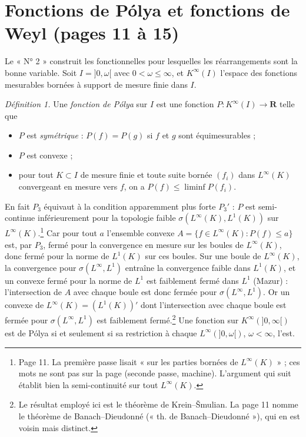 \documentclass[11pt,a4paper]{article}
\begin{document}
\section*{Fonctions de Pólya et fonctions de Weyl (pages 11 à 15)}

Le « N° 2 » construit les fonctionnelles pour lesquelles les réarrangements
sont la bonne variable. Soit $I = ]0,\omega[$ avec $0 < \omega \leq \infty$,
et $K^\infty(I)$ l'espace des fonctions mesurables bornées à support de
mesure finie dans $I$.

\emph{Définition 1.} Une \emph{fonction de Pólya} sur $I$ est une fonction
$P : K^\infty(I) \to \mathbf{R}$ telle que
\begin{itemize}
  \item[$P_1$)] $P$ est \emph{symétrique} : $P(f) = P(g)$ si $f$ et $g$ sont
    équimesurables ;
  \item[$P_2$)] $P$ est convexe ;
  \item[$P_3$)] pour tout $K \subset I$ de mesure finie et toute suite
    bornée $(f_i)$ dans $L^\infty(K)$ convergeant en mesure vers $f$, on a
    $P(f) \leq \liminf P(f_i)$.
\end{itemize}
En fait $P_3$ équivaut à la condition apparemment plus forte $P_3'$ : $P$ est
semi-continue inférieurement pour la topologie faible $\sigma(L^\infty(K),
L^1(K))$ sur $L^\infty(K)$.\footnote{Page 11. La première passe lisait « sur
les parties bornées de $L^\infty(K)$ » ; ces mots ne sont pas sur la page
(seconde passe, machine). L'argument qui suit établit bien la semi-continuité
sur tout $L^\infty(K)$.} Car pour tout $a$
l'ensemble convexe $A = \{f \in L^\infty(K) : P(f) \leq a\}$ est, par $P_3$,
fermé pour la convergence en mesure sur les boules de $L^\infty(K)$, donc
fermé pour la norme de $L^1(K)$ sur ces boules. Sur une boule de
$L^\infty(K)$, la convergence pour $\sigma(L^\infty, L^1)$ entraîne la
convergence faible dans $L^1(K)$, et un convexe fermé pour la norme de $L^1$
est faiblement fermé dans $L^1$ (Mazur) : l'intersection de $A$ avec chaque
boule est donc fermée pour $\sigma(L^\infty, L^1)$. Or un convexe de
$L^\infty(K) = (L^1(K))'$ dont l'intersection avec chaque boule est fermée
pour $\sigma(L^\infty, L^1)$ est faiblement fermé.\footnote{Le résultat
employé ici est le théorème de Krein--Šmulian. La page 11 nomme le théorème
de Banach--Dieudonné (« th. de Banach--Dieudonné »), qui en est voisin mais
distinct.} Une fonction sur
$K^\infty(]0,\infty[)$ est de Pólya si et seulement si sa restriction à chaque
$L^\infty(]0,\omega[)$, $\omega < \infty$, l'est.
\end{document}
